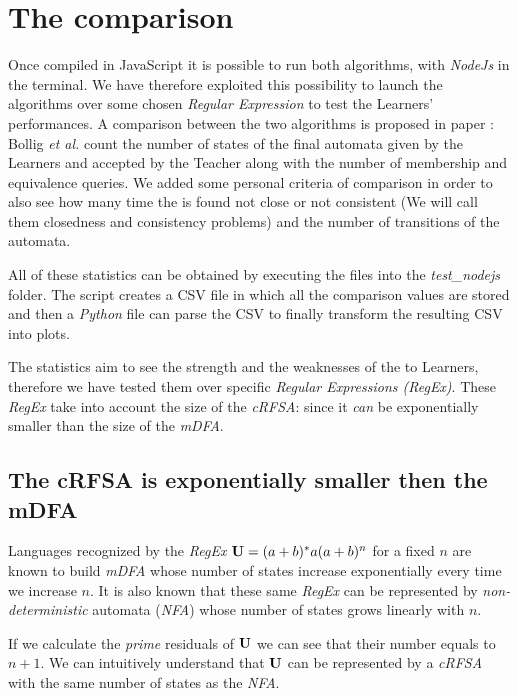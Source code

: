 \section{The comparison}

Once compiled in JavaScript it is possible to run both algorithms, with \textit{NodeJs} in the terminal. We have therefore exploited this possibility to launch the algorithms over some chosen \textit{Regular Expression} to test the Learners' performances. A comparison between the two algorithms is proposed in paper \cite{NLPaper}: Bollig \textit{et al.} count the number of states of the final automata given by the Learners and accepted by the Teacher along with the number of membership and equivalence queries. We added some personal criteria of comparison in order to also see how many time the \OT is found not close or not consistent (We will call them closedness and consistency problems) and the number of transitions of the automata.

All of these statistics can be obtained by executing the files into the \textit{test\_nodejs} folder. The script creates a CSV file in which all the comparison values are stored and then a \textit{Python} file can parse the CSV to finally transform the resulting CSV into plots.

The statistics aim to see the strength and the weaknesses of the to Learners, therefore we have tested them over specific \textit{Regular Expressions (RegEx)}. These \textit{RegEx} take into account the size of the \textit{cRFSA}: since it \textit{can} be exponentially smaller than the size of the \textit{mDFA}.

\subsection{The cRFSA is exponentially smaller then the mDFA}
Languages recognized by the \textit{RegEx} $\mathbf{U} = (a+b)^*a(a+b)^n$ for a fixed $n$ are known to build \textit{mDFA} whose number of states increase exponentially every time we increase $n$. It is also known that these same \textit{RegEx} can be represented by \textit{non-deterministic} automata (\textit{NFA}) whose number of states grows linearly with $n$.

If we calculate the \textit{prime} residuals of $\mathbf{U}$ we can see that their number equals to $n+1$. We can intuitively understand that $\mathbf{U}$ can be represented by a \textit{cRFSA} with the same number of states as the \textit{NFA}.

